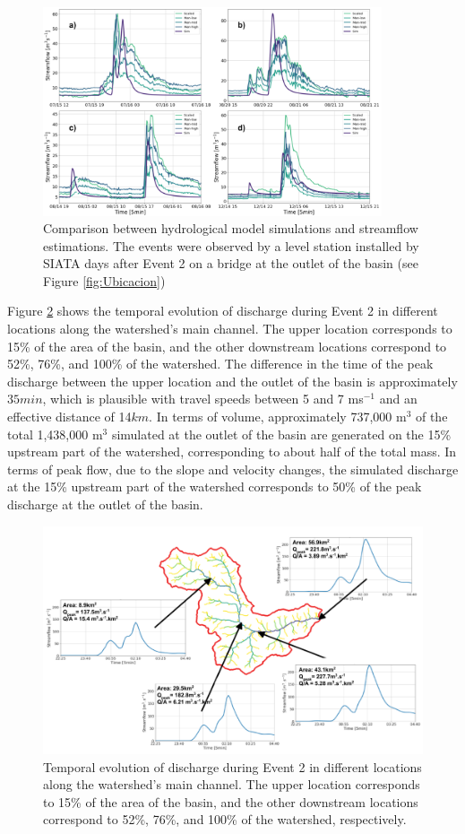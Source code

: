 \documentclass[hess, manuscript]{copernicus}
\begin{document}
\begin{figure}[t]
\centering
 \includegraphics[width=10cm]{Figures/Eventos_Validacion.png}
 \caption{Comparison between hydrological model simulations and streamflow estimations. The events were observed by a level station installed by SIATA days after Event 2 on a bridge at the outlet of the basin (see Figure \ref{fig:Ubicacion})}
    \label{fig:validacion}
\end{figure}


Figure \ref{fig:dischargeEvent2} shows the temporal evolution of discharge during Event 2 in different locations along the watershed's main channel. The upper location corresponds to 15\% of the area of the basin, and the other downstream locations correspond to 52\%, 76\%, and 100\% of the watershed. The difference in the time of the peak discharge between the upper location and the outlet of the basin is approximately $35min$, which is plausible with travel speeds between 5 and 7 ms$^{-1}$ and an effective distance of 14$km$.  In terms of volume, approximately 737,000 m$^3$ of the total 1,438,000 m$^3$ simulated at the outlet of the basin are generated on the 15\% upstream part of the watershed,  corresponding to about half of the total mass. In terms of peak flow, due to the slope and velocity changes, the simulated discharge at the 15\% upstream part of the watershed corresponds to 50\% of the peak discharge at the outlet of the basin.\\

\begin{figure}[t]
\centering
\includegraphics[width =12cm]{Figures/Evolucion_evento.png}
\caption{Temporal evolution of discharge during Event 2 in different locations along the watershed's main channel. The upper location corresponds to 15\% of the area of the basin, and the other downstream locations correspond to 52\%, 76\%, and 100\% of the watershed, respectively.}
\label{fig:dischargeEvent2}
\end{figure}
\end{document}
